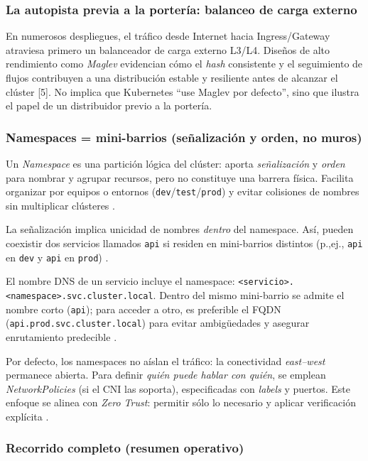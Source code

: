 \documentclass[journal]{IEEEtran}
\begin{document}
\medskip
\subsubsection{La autopista previa a la portería: balanceo de carga externo}

En numerosos despliegues, el tráfico desde Internet hacia Ingress/Gateway atraviesa primero un balanceador de carga externo L3/L4. Diseños de alto rendimiento como \emph{Maglev} evidencian cómo el \emph{hash} consistente y el seguimiento de flujos contribuyen a una distribución estable y resiliente antes de alcanzar el clúster [5]. No implica que Kubernetes “use Maglev por defecto”, sino que ilustra el papel de un distribuidor previo a la portería.

\subsubsection{Namespaces = mini-barrios (señalización y orden, no muros)}

Un \emph{Namespace} es una partición lógica del clúster: aporta \emph{señalización} y \emph{orden} para nombrar y agrupar recursos, pero no constituye una barrera física. Facilita organizar por equipos o entornos (\texttt{dev}/\texttt{test}/\texttt{prod}) y evitar colisiones de nombres sin multiplicar clústeres \cite{ref2}.

\medskip
La señalización implica unicidad de nombres \emph{dentro} del namespace. Así, pueden coexistir dos servicios llamados \texttt{api} si residen en mini-barrios distintos (p.,ej., \texttt{api} en \texttt{dev} y \texttt{api} en \texttt{prod}) \cite{ref2}.

\medskip
El nombre DNS de un servicio incluye el namespace: \texttt{<servicio>.<namespace>.svc.cluster.local}. Dentro del mismo mini-barrio se admite el nombre corto (\texttt{api}); para acceder a otro, es preferible el FQDN (\texttt{api.prod.svc.cluster.local}) para evitar ambigüedades y asegurar enrutamiento predecible \cite{ref13,ref2}.

\medskip
Por defecto, los namespaces no aíslan el tráfico: la conectividad \emph{east--west} permanece abierta. Para definir \emph{quién puede hablar con quién}, se emplean \emph{NetworkPolicies} (si el CNI las soporta), especificadas con \emph{labels} y puertos. Este enfoque se alinea con \emph{Zero Trust}: permitir sólo lo necesario y aplicar verificación explícita \cite{ref4,ref24,ref25,ref26}.

\medskip
\subsubsection{Recorrido completo (resumen operativo)}
\end{document}
